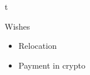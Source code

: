 \documentclass[10pt]{extarticle}
\begin{document}
	\setlength{\currentpos}{\getposy+20pt}

	\begin{centralpart}{}{}{t}
		\begin{titleblock}{Wishes}{}{}{}
			\vspace*{-8pt}
			\begin{itemize}[label=$\circ$]
				\item Relocation
				\item Payment in crypto
			\end{itemize}
		\end{titleblock}
	\end{centralpart}

	\signature{S}
\end{document}
